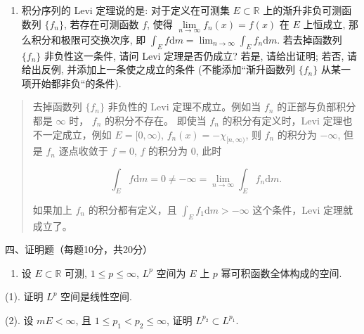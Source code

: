 \documentclass[
]{article}
\providecommand{\tightlist}{%
  \setlength{\itemsep}{0pt}\setlength{\parskip}{0pt}}
\begin{document}
\begin{enumerate}
\def\labelenumi{\arabic{enumi}.}
\setcounter{enumi}{3}
\tightlist
\item
  积分序列的 Levi 定理说的是: 对于定义在可测集 \(E \subset \mathbb{R}\)
  上的渐升非负可测函数列 \(\{f_n\}\), 若存在可测函数 \(f\), 使得
  \(\lim\limits_{n\to\infty} f_n(x) = f(x)\) 在 \(E\) 上恒成立,
  那么积分和极限可交换次序, 即
  \(\displaystyle \int_E f \mathrm{d} m = \lim_{n \to \infty} \int_E f_n \mathrm{d} m\).
  若去掉函数列 \(\{f_n\}\) 非负性这一条件, 请问 Levi 定理是否仍成立?
  若是, 请给出证明; 若否, 请给出反例, 并添加上一条使之成立的条件
  (不能添加``渐升函数列 \(\{f_n\}\) 从某一项开始都非负``的条件).
\end{enumerate}

\begin{quote}
去掉函数列 \(\{f_n\}\) 非负性的 Levi 定理不成立。例如当 \(f_n\)
的正部与负部积分都是 \(\infty\) 时， \(f_n\) 的积分不存在。 即使当
\(f_n\) 的积分有定义时，Levi 定理也不一定成立，例如 \(E = [0, \infty)\),
\(f_n(x) = - \chi_{[n, \infty)}\), 则 \(f_n\) 的积分为 \(- \infty\),
但是 \(f_n\) 逐点收敛于 \(f = 0\), \(f\) 的积分为 \(0\), 此时

\[\int_E f \mathrm{d} m = 0 \neq - \infty = \lim_{n \to \infty} \int_E f_n \mathrm{d} m.\]

如果加上 \(f_n\) 的积分都有定义，且
\(\displaystyle \int_E f_1 \mathrm{d} m > - \infty\) 这个条件，Levi
定理就成立了。
\end{quote}

四、证明题（每题10分，共20分）

\begin{enumerate}
\def\labelenumi{\arabic{enumi}.}
\tightlist
\item
  设 \(E \subset \mathbb{R}\) 可测, \(1 \leqslant p \leqslant \infty\),
  \(L^p\) 空间为 \(E\) 上 \(p\) 幂可积函数全体构成的空间.
\end{enumerate}

(1). 证明 \(L^p\) 空间是线性空间.

(2). 设 \(m E < \infty\), 且 \(1 \leqslant p_1 < p_2 \leqslant \infty\),
证明 \(L^{p_2} \subset L^{p_1}\).
\end{document}
